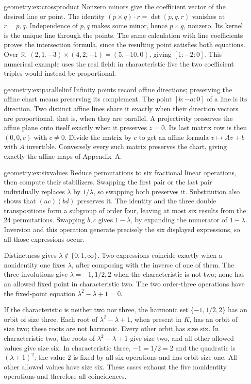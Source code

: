 \begin{solution}{geometry:ex:crossproduct}
\idea Nonzero minors give the coefficient vector of the desired line or point.
\writeup The identity $(p\times q)\cdot r=\det(p,q,r)$ vanishes at $r=p,q$. Independence of $p,q$ makes some minor, hence $p\times q$, nonzero. Its kernel is the unique line through the points. The same calculation with line coefficients proves the intersection formula, since the resulting point satisfies both equations. Over $\mathbb R$,
$(2,1,-3)\times(4,2,-1)=(5,-10,0)$, giving $[1:-2:0]$. This numerical example uses the real field: in characteristic five the two coefficient triples would instead be proportional.
\end{solution}
\begin{solution}{geometry:ex:parallelinf}
\idea Infinity points record affine directions; preserving the affine chart means preserving its complement.
\writeup The point $[b:-a:0]$ of a line is its direction. Two distinct affine lines share it exactly when their direction vectors are proportional, that is, when they are parallel. A projectivity preserves the affine plane onto itself exactly when it preserves $z=0$. Its last matrix row is then $(0,0,c)$ with $c\ne0$. Divide the matrix by $c$ to get an affine formula $v\mapsto Av+b$ with $A$ invertible. Conversely every such matrix preserves the chart, giving exactly the affine maps of Appendix~A.
\end{solution}
\begin{solution}{geometry:ex:sixvalues}
\idea Reduce permutations to six fractional linear operations, then compute their stabilizers.
\writeup Swapping the first pair or the last pair individually replaces $\lambda$ by $1/\lambda$, so swapping both preserves it. Substitution also shows that $(ac)(bd)$ preserves it. The identity and the three double transpositions form a subgroup of order four, leaving at most six results from the $24$ permutations. Swapping $b,c$ gives $1-\lambda$, by expanding the numerator of $1-\lambda$. Inversion and this operation generate precisely the six displayed expressions, so all those expressions occur.

Distinctness gives $\lambda\notin\{0,1,\infty\}$. Two expressions coincide exactly when a nonidentity one fixes $\lambda$, after composing with the inverse of one of them. The three involutions give $\lambda=-1,1/2,2$ when the characteristic is not two; none has an allowed fixed point in characteristic two. The two order-three operations have the fixed-point equation $\lambda^2-\lambda+1=0$.

If the characteristic is neither two nor three, the harmonic set $\{-1,1/2,2\}$ has an orbit of size three. Each root of $\lambda^2-\lambda+1$, when present in $K$, has an orbit of size two; these roots are not harmonic. Every other orbit has size six. In characteristic two, the roots of $\lambda^2+\lambda+1$ give size two, and all other allowed values give size six. In characteristic three, $-1=1/2=2$ and the quadratic is $(\lambda+1)^2$; the value $2$ is fixed by all six operations and has orbit size one. All other allowed values have size six. These cases exhaust the five nonidentity operations and therefore all coincidences.
\end{solution}
